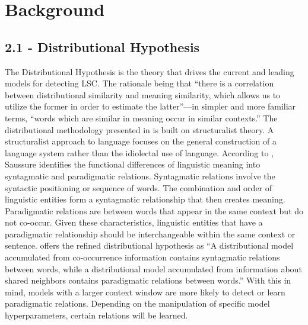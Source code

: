 \section{Background}
\label{sec:background}

\subsection{2.1 - Distributional Hypothesis}

The Distributional Hypothesis is the theory that drives the current and leading models for detecting LSC. The rationale being that “there is a correlation between distributional similarity and meaning similarity, which allows us to utilize the former in order to estimate the latter”—in simpler and more familiar terms, “words which are similar in meaning occur in similar contexts.” \citep{sahlgren2008distributional} The distributional methodology presented in \citet{harris1970distributional} is built on structuralist theory. A structuralist approach to language focuses on the general construction of a language system rather than the idiolectal use of language. According to \citet{sahlgren2008distributional}, Saussure identifies the functional differences of linguistic meaning into syntagmatic and paradigmatic relations. Syntagmatic relations involve the syntactic positioning or sequence of words. The combination and order of linguistic entities form a syntagmatic relationship that then creates meaning. Paradigmatic relations are between words that appear in the same context but do not co-occur. Given these characteristics, linguistic entities that have a paradigmatic relationship should be interchangeable within the same context or sentence. \citet{sahlgren2008distributional} offers the refined distributional hypothesis as “A distributional model accumulated from co-occurrence information contains syntagmatic relations between words, while a distributional model accumulated from information about shared neighbors contains paradigmatic relations between words.” With this in mind, models with a larger context window are more likely to detect or learn paradigmatic relations. Depending on the manipulation of specific model hyperparameters, certain relations will be learned. 


